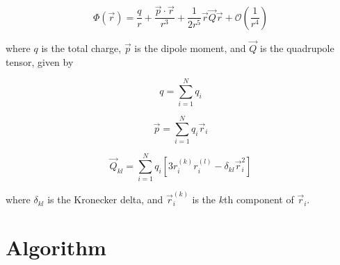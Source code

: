 \documentclass[12pt,a4paper,twoside]{article}
\begin{document}
\begin{equation}\label{eq:multipole}
	\Phi(\vec{r}) = \frac{q}{r} + \frac{\vec{p} \cdot \vec{r}}{r^3} + \frac{1}{2r^5}\vec{r}\vec{Q}\vec{r} + \mathcal{O}\left(\frac{1}{r^4}\right)
\end{equation}

where $q$ is the total charge, $\vec{p}$ is the dipole moment, and $\vec{Q}$ is the quadrupole tensor, given by

\begin{equation}\label{eq:charge}
	q = \sum_{i=1}^N q_i
\end{equation}

\begin{equation}\label{eq:dipole}
	\vec{p} = \sum_{i=1}^N q_i \vec{r}_i
\end{equation}

\begin{equation}\label{eq:quadrupole}
	\vec{Q}_{kl} = \sum_{i=1}^N q_i \left[ 3r_i^{(k)}r_i^{(l)} - \delta_{kl}\vec{r}_i^2 \right]
\end{equation}

where $\delta_{kl}$ is the Kronecker delta, and $\vec{r}_i^{(k)}$ is the $k$th component of $\vec{r}_i$.

\section{Algorithm}
\label{sec:Algo}
\medskip
\end{document}
